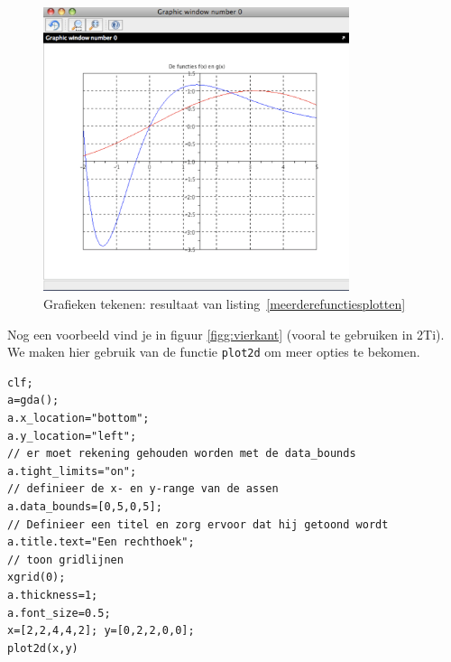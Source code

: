 \begin{figure}[h!t]
   \begin{center}
    \includegraphics[width=0.8\textwidth]{figuren/scilab/10grafiek.pdf}
  \caption{Grafieken tekenen: resultaat van listing~\ref{meerderefunctiesplotten}}
	\label{figg:meerderf}
	\end{center}
\end{figure}


 
Nog een voorbeeld vind je in figuur \ref{figg:vierkant} (vooral te gebruiken in 2Ti). We maken hier gebruik van de functie \verb+plot2d+ om meer opties te bekomen.
\begin{lstlisting}[caption={Vierkant tekenen}, label=plot2d]	
clf;
a=gda(); 
a.x_location="bottom";
a.y_location="left";
// er moet rekening gehouden worden met de data_bounds
a.tight_limits="on";
// definieer de x- en y-range van de assen
a.data_bounds=[0,5,0,5];
// Definieer een titel en zorg ervoor dat hij getoond wordt
a.title.text="Een rechthoek";
// toon gridlijnen
xgrid(0);
a.thickness=1;
a.font_size=0.5;
x=[2,2,4,4,2]; y=[0,2,2,0,0];
plot2d(x,y)    
 \end{lstlisting}
 

